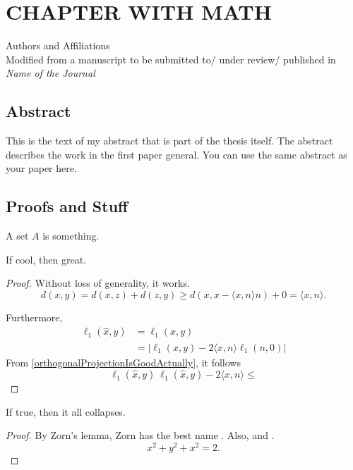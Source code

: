 \newcommand{\RipsD}{\operatorname{Rips}_1}
\newcommand{\Rips}{\operatorname{Rips}}
\newcommand{\ver}{\operatorname{ver}}
\newcommand{\diam}{\operatorname{Diam}}
\newcommand{\midR}{\operatorname{mid}}
\newcommand{\dN}{N_1^*}

\chapter{CHAPTER WITH MATH}
\begin{center}
    Authors and Affiliations \\
    Modified from a manuscript to be submitted to/ under review/ published in \textit{Name of the Journal}
\end{center}

\section{Abstract}
This is the text of my abstract that is part of the thesis itself.
The abstract describes the work in the first paper general. You can use the same abstract as your paper here.
\section{Proofs and Stuff}
\begin{definition}
    A set $A$ is something.
\end{definition}

\begin{lemma}
    If cool, then great.
\end{lemma}
\begin{proof}
    Without loss of generality, it works.
    \begin{equation}
    \label{orthogonalProjectionIsGoodActually}
        d(x,y)= d(x,z)+d(z,y) \geq d(x,x-\langle x,n\rangle n )+0 = \langle x,n\rangle.
    \end{equation}

    Furthermore,
    \begin{align}
        \ell_1(\hat{x},y) & = \ell_1 (x,y)                     \\
                          & =|\ell_1(x,y)-2\langle x,n\rangle \ell_1(n,0)|        
    \end{align}
    From \autoref{orthogonalProjectionIsGoodActually}, it follows \[\ell_1(\hat{x},y)\ \ell_1(\hat{x},y)-2\langle x,n\rangle \leq\] 
\end{proof}




\begin{theorem}
    If true, then it all collapses.
\end{theorem}
\begin{proof}
    By Zorn's lemma, Zorn has the best name \autocite{martiniCompleteReducedConvex2019}.
    Also, \autocite{chenGraphHomotopyGraham2001} and \autocite{dochtermannMinimalGraphsContractible2023}.
    \[x^2+y^2+x^2=2.\]

\end{proof}

\printbibliography[heading=subbibnumbered]

